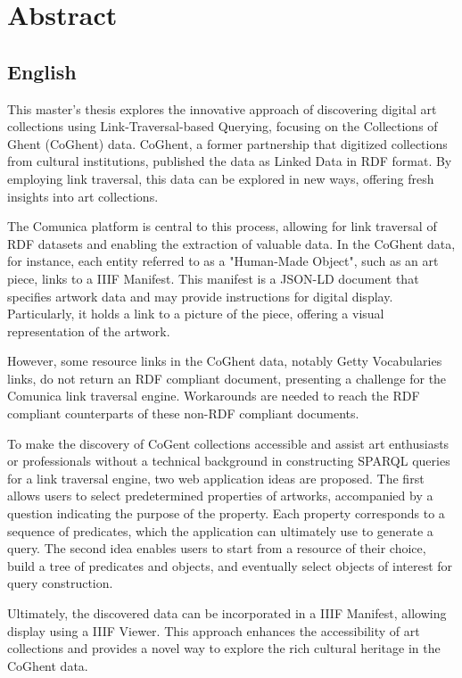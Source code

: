 \chapter*{Abstract}

\section*{English}

This master's thesis explores the innovative approach of discovering digital art collections using Link-Traversal-based Querying, focusing on the Collections of Ghent (CoGhent) data. CoGhent, a former partnership that digitized collections from cultural institutions, published the data as Linked Data in RDF format. By employing link traversal, this data can be explored in new ways, offering fresh insights into art collections.

The Comunica platform is central to this process, allowing for link traversal of RDF datasets and enabling the extraction of valuable data. In the CoGhent data, for instance, each entity referred to as a "Human-Made Object", such as an art piece, links to a IIIF Manifest. This manifest is a JSON-LD document that specifies artwork data and may provide instructions for digital display. Particularly, it holds a link to a picture of the piece, offering a visual representation of the artwork.

However, some resource links in the CoGhent data, notably Getty Vocabularies links, do not return an RDF compliant document, presenting a challenge for the Comunica link traversal engine. Workarounds are needed to reach the RDF compliant counterparts of these non-RDF compliant documents.

To make the discovery of CoGent collections accessible and assist art enthusiasts or professionals without a technical background in constructing SPARQL queries for a link traversal engine, two web application ideas are proposed. The first allows users to select predetermined properties of artworks, accompanied by a question indicating the purpose of the property. Each property corresponds to a sequence of predicates, which the application can ultimately use to generate a query. The second idea enables users to start from a resource of their choice, build a tree of predicates and objects, and eventually select objects of interest for query construction.

Ultimately, the discovered data can be incorporated in a IIIF Manifest, allowing display using a IIIF Viewer. This approach enhances the accessibility of art collections and provides a novel way to explore the rich cultural heritage in the CoGhent data.

